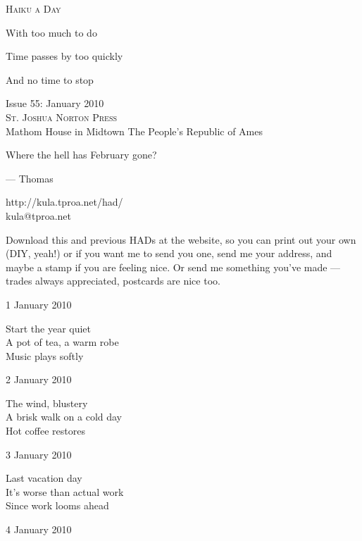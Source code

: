 \documentclass[12pt]{article}
\begin{document}
\begin{center}
{\fontsize{36}{48}\selectfont \textsc{Haiku a Day }}
\end{center}

\vspace*{3.5cm}

{\fontsize{26}{52}\selectfont 
With too much to do
	 
Time passes by too quickly
	 
And no time to stop

}

\vspace*{5.0cm}
\begin{center}
{\large{Issue 55: January 2010}} \\[5mm]
{\fontsize{8}{8}\selectfont  \textsc{ St. Joshua Norton Press }} \\[1mm]
{\fontsize{6}{6}\selectfont Mathom House in Midtown \textbar The People's Republic of Ames }
\end{center}


\newpage

Where the hell has February gone?

--- Thomas

http://kula.tproa.net/had/ \\
kula@tproa.net

Download this and previous HADs at the website, so you can
print out your own (DIY, yeah!) or if you want me to send
you one, send me your address, and maybe a stamp if you
are feeling nice. Or send me something you've made ---
trades always appreciated, postcards are nice too.

\vspace*{2cm}

1 January 2010

Start the year quiet \\
A pot of tea, a warm robe \\
Music plays softly

2 January 2010

The wind, blustery \\
A brisk walk on a cold day \\
Hot coffee restores

3 January 2010

Last vacation day \\
It's worse than actual work \\
Since work looms ahead

\newpage

4 January 2010
\end{document}
